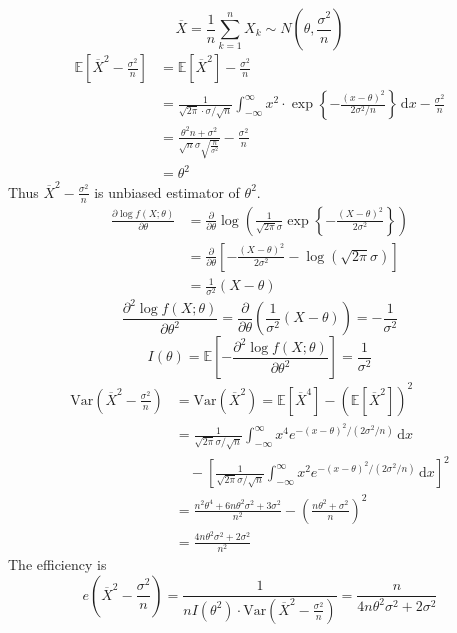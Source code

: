 \[
\overline{X}=\frac{1}{n}\sum_{k=1}^{n} X_k\sim N\left( \theta,\frac{\sigma^{2}}{n} \right)
\]
\[
\begin{aligned}
\mathbb{E}\left[ \overline{X}^2-\frac{\sigma^{2}}{n} \right] & =\mathbb{E}[\overline{X}^2]-\frac{\sigma^{2}}{n} \\
& =\frac{1}{\sqrt{ 2\pi }\cdot \sigma/\sqrt{ n }}\int_{-\infty}^{\infty} x^2\cdot \exp \left\{  -\frac{(x-\theta)^2}{2\sigma^{2}/n}  \right\} \, \mathrm{d}x -\frac{\sigma^{2}}{n}  \\
& =\frac{\theta ^2 n+\sigma ^2}{\sqrt{n} \sigma  \sqrt{\frac{n}{\sigma ^2}}}-\frac{\sigma^{2}}{n}  \\
& =\theta^{2}
\end{aligned}
\]
Thus $\overline{X}^2-\frac{\sigma^{2}}{n}$ is unbiased estimator of $\theta^{2}$.
\[
\begin{aligned}
\frac{ \partial \log f(X;\theta) }{ \partial \theta }  & =\frac{ \partial   }{ \partial \theta } \log\left( \frac{1}{\sqrt{ 2\pi }\sigma}\exp \left\{  -\frac{(X-\theta )^2}{2\sigma^{2}}  \right\} \right) \\
 & =\frac{ \partial   }{ \partial \theta } \left[ -\frac{(X-\theta)^2}{2\sigma^{2}}-\log(\sqrt{ 2\pi  }\sigma) \right] \\
 & =\frac{1}{\sigma^{2}}(X-\theta)
\end{aligned}
\]
\[
\frac{ \partial^2 \log f(X;\theta) }{ \partial \theta ^2 } =\frac{ \partial   }{ \partial \theta } \left( \frac{1}{\sigma^{2}}(X-\theta) \right)=-\frac{1}{\sigma^{2}}
\]
\[
I(\theta)=\mathbb{E}\left[ -\frac{ \partial^2 \log f(X;\theta) }{ \partial \theta ^2 }  \right]=\frac{1}{\sigma^{2}}
\]
\[
\begin{aligned}
\mathrm{Var}\left( \overline{X}^2-\frac{\sigma^{2}}{n} \right) & =\mathrm{Var}(\overline{X}^2)=\mathbb{E}[\overline{X}^{4}]-(\mathbb{E}[\overline{X}^2])^2 \\
 & =\frac{1}{\sqrt{ 2\pi }\sigma/\sqrt{ n }}\int_{-\infty}^{\infty} x^{4}e^{ -(x-\theta)^2/(2\sigma^{2}/n) } \, \mathrm{d}x  \\
 & \quad -\left[ \frac{1}{\sqrt{ 2\pi }\sigma/\sqrt{ n }}\int_{-\infty}^{\infty} x^{2}e^{ -(x-\theta)^2/(2\sigma^{2}/n) } \, \mathrm{d}x \right]^2 \\
 & =\frac{n^2\theta^{4}+6n\theta^{2}\sigma^{2}+3\sigma^{2}}{n^2}-\left( \frac{n\theta^{2}+\sigma^{2}}{n} \right)^2 \\
 & =\frac{4n\theta^{2}\sigma^{2}+2\sigma^{2}}{n^2}
\end{aligned}
\]
The efficiency is
\[
e\left( \overline{X}^2-\frac{\sigma^{2}}{n} \right)=\frac{1}{nI(\theta^{2})\cdot\mathrm{Var}\left( \overline{X}^2-\frac{\sigma^{2}}{n} \right)}=\frac{n}{4n\theta^{2}\sigma^{2}+2\sigma^{2}}
\]
